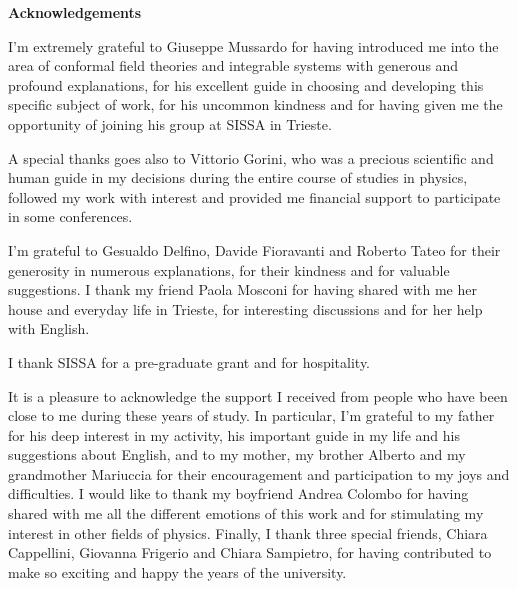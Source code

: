 \documentclass[a4paper,12pt]{report}
\begin{document}
\newpage


\begin{flushleft}\Large
\textbf{Acknowledgements}
\end{flushleft}


\vspace{0.5cm}


I'm extremely grateful to Giuseppe Mussardo for having introduced me into the area of conformal field theories
and integrable systems with generous and profound explanations, for his excellent guide in choosing and developing
this specific subject of work, for his uncommon kindness and for having given me the opportunity of joining his
group at SISSA in Trieste.

A special thanks goes also to Vittorio Gorini, who was a precious scientific and human guide in my decisions
during the entire course of studies in physics, followed my work with interest and provided me financial support
to participate in some conferences.

I'm grateful to Gesualdo Delfino, Davide Fioravanti and Roberto Tateo for their generosity in numerous
explanations, for their kindness and for valuable suggestions. I thank my friend Paola Mosconi for having shared
with me her house and everyday life in Trieste, for interesting discussions and for her help with English.

I thank SISSA for a pre-graduate grant and for hospitality.

It is a pleasure to acknowledge the support I received from people who have been close to me during these years of
study. In particular, I'm grateful to my father for his deep interest in my activity, his important guide in my
life and his suggestions about English, and to my mother, my brother Alberto and my grandmother Mariuccia for
their encouragement and participation to my joys and difficulties. I would like to thank my boyfriend Andrea
Colombo for having shared with me all the different emotions of this work and for stimulating my interest in
other fields of physics. Finally, I thank three special friends, Chiara Cappellini, Giovanna Frigerio and Chiara
Sampietro, for having contributed to make so exciting and happy the years of the university.



\newpage
\end{document}
